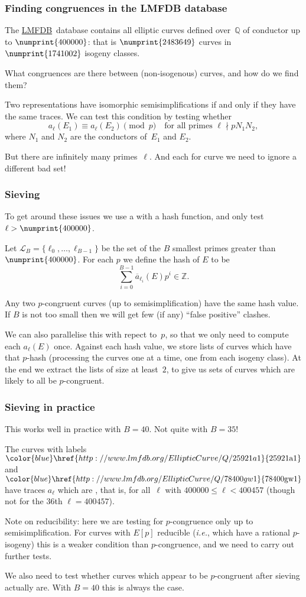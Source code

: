 \documentclass[handout]{beamer}
\newcommand{\Q}{\mathbb Q}
\newcommand{\Z}{\mathbb Z}
\newcommand{\LL}{\mathcal L}
\newcommand{\lmfdbec}[3]{\color{blue}\href{http://www.lmfdb.org/EllipticCurve/Q/#1#2#3}{{\text{\rm#1#2#3}}}}
\newcommand{\LMFDB}{\href{http://www.lmfdb.org/EllipticCurve/Q}{\color{blue}LMFDB}}
\newcommand{\high}[1]{\emph{\color{blue}{#1}}}
\begin{document}
\begin{frame}\frametitle{Finding congruences in the LMFDB database}
The \LMFDB\ database contains all elliptic curves defined over~$\Q$ of
conductor up to $\numprint{400000}$: that is $\numprint{2483649}$
curves in $\numprint{1741002}$ isogeny classes.

What congruences are there between (non-isogenous) curves, and how do
we find them?

Two representations have isomorphic semisimplifications if and only if
they have the same traces. We can test this condition by testing
whether
\[ a_{\ell}(E_1)\equiv a_{\ell}(E_2)\pmod{p}
\quad \text{for all primes } \ell \nmid pN_1N_2,
\] 
where $N_1$ and $N_2$ are the conductors of~$E_1$ and $E_2$.

But there are infinitely many primes~$\ell$.  And each for curve we need to
ignore a different bad set!
\end{frame}

\begin{frame}\frametitle{Sieving}
  To get around these issues we use a \high{sieve} with a hash
  function, and only test $\ell>\numprint{400000}$.

  Let $\LL_B=\{\ell_0,\dots,\ell_{B-1}\}$ be the set of the $B$
  smallest primes greater than $\numprint{400000}$.  For each $p$ we
  define the hash of $E$ to be
  \[\sum_{i=0}^{B-1}\overline{a}_{\ell_i}(E)p^i\in\Z.\]

 Any two $p$-congruent curves (up to semisimplification) have the same
 hash value.  If $B$ is not too small then we will get few (if any)
 ``false positive'' clashes.

  We can also parallelise this with repect to~$p$, so that we only
  need to compute each $a_{\ell}(E)$ once.  Against each hash value,
  we store lists of curves which have that $p$-hash (processing the
  curves one at a time, one from each isogeny class).  At the end we
  extract the lists of size at least~$2$, to give us sets of curves
  which are likely to all be $p$-congruent. %

\end{frame}

\begin{frame}\frametitle{Sieving in practice}
  This works well in practice with $B=40$. Not quite with $B=35$!

  \pause
  \medskip
  The curves with labels $\lmfdbec{25921}{a}{1}$ and
  $\lmfdbec{78400}{gw}{1}$ have traces $a_{\ell}$ which are \high{equal
    for all~$\ell\in\LL_{35}$}, that is, for all~$\ell$ with
  $400000\le \ell<400457$ (though not for the 36th $\ell=400457$).
  \pause
  \medskip

  Note on reducibility: here we are testing for $p$-congruence only up
  to semisimplification.  For curves with $E[p]$ reducible
  (\textit{i.e.}, which have a rational $p$-isogeny) this is a weaker
  condition than $p$-congruence, and we need to carry out further
  tests.

    \pause
  \medskip
  We also need to test whether curves which appear to be $p$-congruent
  after sieving actually are.  With $B=40$ this is always the case.
\end{frame}
\end{document}
